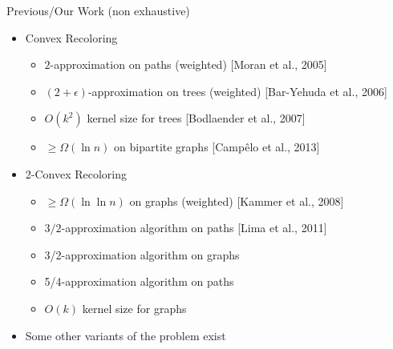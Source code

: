 \def\refsize{\tiny}

\begin{frame}{Previous/\alert{Our} Work (non exhaustive)}
\begin{itemize}
\item
Convex Recoloring
\begin{itemize}

\pause\item
$2$-approximation on paths (weighted)
{\refsize[Moran et al., 2005]}

\pause\item
$(2 + \epsilon)$-approximation on trees (weighted) 
{\refsize[Bar-Yehuda et al., 2006]}

\pause\item
$O(k^2)$ kernel size for trees
{\refsize[Bodlaender et al., 2007]}

\pause\item
$\geq \Omega(\ln{n})$ on bipartite graphs
{\refsize[Camp\^elo et al., 2013]}


\end{itemize}
\pause\item
2-Convex Recoloring
\begin{itemize}


\pause\item
$\geq \Omega(\ln\ln{n})$ on graphs (weighted)
{\refsize[Kammer et al., 2008]}

\pause\item
$3/2$-approximation algorithm on paths
{\refsize[Lima et al., 2011]}

\pause\item
\alert{3/2-approximation algorithm on graphs}

\pause\item
\alert{5/4-approximation algorithm on paths}

\pause\item
\alert{$O(k)$ kernel size for graphs}


\end{itemize}
\pause\item
Some other variants of the problem exist
\end{itemize}
\end{frame}